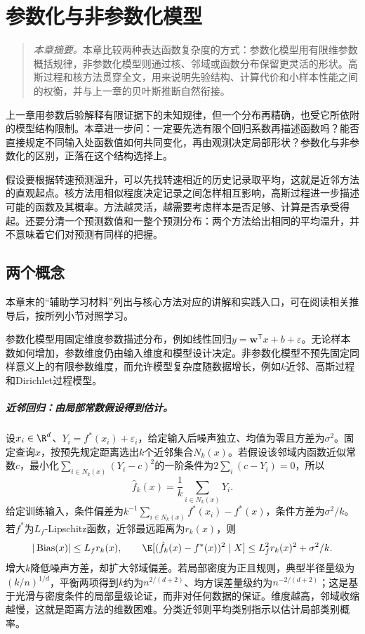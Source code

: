 ﻿\chapter{参数化与非参数化模型}
\begin{quote}\small
\textit{本章摘要。}本章比较两种表达函数复杂度的方式：参数化模型用有限维参数概括规律，非参数化模型则通过核、邻域或函数分布保留更灵活的形状。高斯过程和核方法贯穿全文，用来说明先验结构、计算代价和小样本性能之间的权衡，并与上一章的贝叶斯推断自然衔接。
\end{quote}
上一章用参数后验解释有限证据下的未知规律，但一个分布再精确，也受它所依附的模型结构限制。本章进一步问：一定要先选有限个回归系数再描述函数吗？能否直接规定不同输入处函数值如何共同变化，再由观测决定局部形状？参数化与非参数化的区别，正落在这个结构选择上。

假设要根据转速预测温升，可以先找转速相近的历史记录取平均，这就是近邻方法的直观起点。核方法用相似程度决定记录之间怎样相互影响，高斯过程进一步描述可能的函数及其概率。方法越灵活，越需要考虑样本是否足够、计算是否承受得起。还要分清一个预测数值和一整个预测分布：两个方法给出相同的平均温升，并不意味着它们对预测有同样的把握。

\section{两个概念}

本章末的“辅助学习材料”列出与核心方法对应的讲解和实践入口，可在阅读相关推导后，按所列小节对照学习。

参数化模型用固定维度参数描述分布，例如线性回归$y=\bm{w}^{\mathsf T}x+b+\varepsilon$。无论样本数如何增加，参数维度仍由输入维度和模型设计决定。非参数化模型不预先固定同样意义上的有限参数维度，而允许模型复杂度随数据增长，例如$k$近邻、高斯过程和Dirichlet过程模型。

\paragraph{近邻回归：由局部常数假设得到估计。}
设$x_i\in\R^d$、$Y_i=f^*(x_i)+\varepsilon_i$，给定输入后噪声独立、均值为零且方差为$\sigma^2$。固定查询$x$，按预先规定距离选出$k$个近邻集合$N_k(x)$。若假设该邻域内函数近似常数$c$，最小化$\sum_{i\in N_k(x)}(Y_i-c)^2$的一阶条件为$2\sum_i(c-Y_i)=0$，所以
\begin{equation}
 \hat f_k(x)=\frac1k\sum_{i\in N_k(x)}Y_i.
\end{equation}
给定训练输入，条件偏差为$k^{-1}\sum_{i\in N_k(x)}f^*(x_i)-f^*(x)$，条件方差为$\sigma^2/k$。若$f^*$为$L_f$-Lipschitz函数，近邻最远距离为$r_k(x)$，则
\begin{equation}
 |\operatorname{Bias}(x)|\leq L_fr_k(x),\qquad
 \E[(\hat f_k(x)-f^*(x))^2\mid X]\leq L_f^2r_k(x)^2+\sigma^2/k.
\end{equation}
增大$k$降低噪声方差，却扩大邻域偏差。若局部密度为正且规则，典型半径量级为$(k/n)^{1/d}$，平衡两项得到$k$约为$n^{2/(d+2)}$、均方误差量级约为$n^{-2/(d+2)}$；这是基于光滑与密度条件的局部量级论证，而非对任何数据的保证。维度越高，邻域收缩越慢，这就是距离方法的维数困难。分类近邻则平均类别指示以估计局部类别概率。

